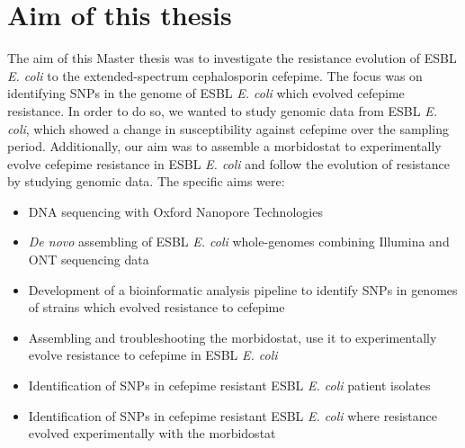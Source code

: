 \section{Aim of this thesis}
The aim of this Master thesis was to investigate the resistance evolution of ESBL \textit{E. coli} to the extended-spectrum cephalosporin cefepime. The focus was on identifying  SNPs in the genome of ESBL \textit{E. coli} which evolved cefepime resistance. In order to do so, we wanted to study genomic data from ESBL \textit{E. coli}, which showed a change in susceptibility against cefepime over the sampling period. Additionally, our aim was to assemble a morbidostat to experimentally evolve cefepime resistance in ESBL \textit{E. coli} and follow the evolution of resistance by studying genomic data. The specific aims were:
\begin{itemize}
	\item DNA sequencing with Oxford Nanopore Technologies
	\item \textit{De novo} assembling of ESBL \textit{E. coli} whole-genomes combining Illumina and ONT sequencing data
	\item Development of a bioinformatic analysis pipeline to identify SNPs in genomes of strains which evolved resistance to cefepime
	\item Assembling and troubleshooting the morbidostat, use it to experimentally evolve resistance to cefepime in ESBL \textit{E. coli}
	 
	\item Identification of SNPs in cefepime resistant ESBL \textit{E. coli} patient isolates
	\item Identification of SNPs in cefepime resistant ESBL \textit{E. coli} where resistance evolved experimentally with the morbidostat
\end{itemize}  